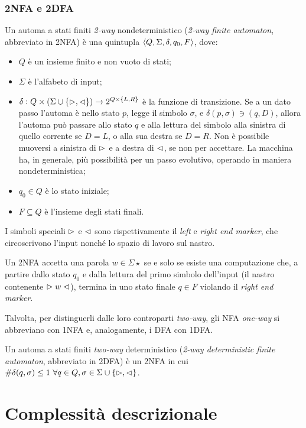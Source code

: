 \subsubsection{2NFA e 2DFA}
\begin{defin}
	Un automa a stati finiti \emph{2-way} nondeterministico (\emph{2-way finite automaton}, abbreviato in 2NFA) è una quintupla $\langle Q,\Sigma,\delta,q_0,F \rangle$, dove:
	\begin{itemize}
		\item $Q$ è un insieme finito e non vuoto di stati;
		\item $\Sigma$ è l'alfabeto di input;
		\item $\delta:Q\times(\Sigma\cup\left\{ \vartriangleright,\vartriangleleft \right\})\to2^{Q\times\left\{ L,R \right\}}$ è la funzione di transizione. Se a un dato passo l'automa è nello stato $p$, legge il simbolo $\sigma$, e $\delta(p,\sigma)\ni (q,D)$, allora l'automa può passare allo stato $q$ e alla lettura del simbolo alla sinistra di quello corrente se $D=L$, o alla sua destra se $D=R$. Non è possibile muoversi a sinistra di $\vartriangleright$ e a destra di $\vartriangleleft$, se non per accettare. La macchina ha, in generale, più possibilità per un passo evolutivo, operando in maniera nondeterministica;
		\item $q_0\in Q$ è lo stato iniziale;
		\item $F\subseteq Q$ è l'insieme degli stati finali.
	\end{itemize}
	I simboli speciali $\vartriangleright$ e $\vartriangleleft$ sono rispettivamente il \emph{left} e \emph{right end marker}, che circoscrivono l'input nonché lo spazio di lavoro sul nastro.

	Un 2NFA accetta una parola $w\in\Sigma\star$ se e solo se esiste una computazione che, a partire dallo stato $q_0$ e dalla lettura del primo simbolo dell'input (il nastro contenente $\vartriangleright w\vartriangleleft$), termina in uno stato finale $q\in F$ violando il \emph{right end marker}.
\end{defin}
Talvolta, per distinguerli dalle loro controparti \emph{two-way}, gli NFA \emph{one-way} si abbreviano con 1NFA e, analogamente, i DFA con 1DFA.
\begin{defin}
	Un automa a stati finiti \emph{two-way} deterministico (\emph{2-way deterministic finite automaton}, abbreviato in 2DFA) è un 2NFA in cui $\# \delta(q,\sigma)\leq 1 ~ \forall q\in Q,\sigma\in\Sigma\cup\left\{ \vartriangleright,\vartriangleleft \right\}$.
\end{defin}



\section{Complessità descrizionale}
